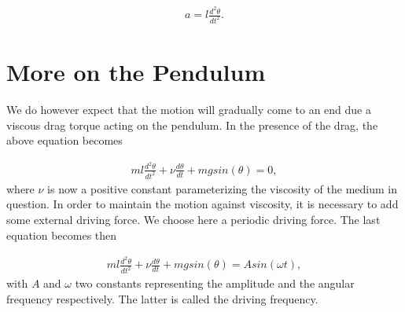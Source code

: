 \documentclass[letterpaper,10pt,english]{sphinxmanual}
\begin{document}
\begin{equation*}
\begin{split}
\begin{equation}
     a=l\frac{d^2\theta}{dt^2}.
\label{_auto21} \tag{22}
\end{equation}
\end{split}
\end{equation*}

\section{More on the Pendulum}
\label{\detokenize{chapter1:more-on-the-pendulum}}
We do however expect that the motion will gradually come to an end due a viscous drag torque acting on the pendulum.
In the presence of the drag, the above equation becomes




\begin{equation*}
\begin{split}
\begin{equation}
   ml\frac{d^2\theta}{dt^2}+\nu\frac{d\theta}{dt}  +mgsin(\theta)=0, \label{eq:pend1} \tag{23}
\end{equation}
\end{split}
\end{equation*}
where \(\nu\) is now a positive constant parameterizing the viscosity
of the medium in question. In order to maintain the motion against
viscosity, it is necessary to add some external driving force.
We choose here a periodic driving force. The last equation becomes then




\begin{equation*}
\begin{split}
\begin{equation}
   ml\frac{d^2\theta}{dt^2}+\nu\frac{d\theta}{dt}  +mgsin(\theta)=Asin(\omega t), \label{eq:pend2} \tag{24}
\end{equation}
\end{split}
\end{equation*}
with \(A\) and \(\omega\) two constants representing the amplitude and
the angular frequency respectively. The latter is called the driving frequency.
\end{document}
